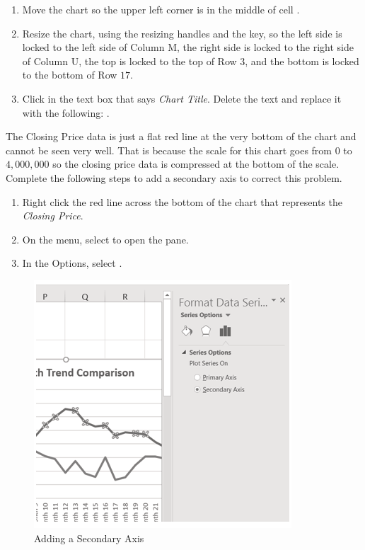 \begin{enumerate}
	\item Move the chart so the upper left corner is in the middle of cell .
	\item Resize the chart, using the resizing handles and the  key, so the left side is locked to the left side of Column M, the right side is locked to the right side of Column U, the top is locked to the top of Row $ 3 $, and the bottom is locked to the bottom of Row $ 17 $.
	\item Click in the text box that says \textit{Chart Title}. Delete the text and replace it with the following: .
\end{enumerate}

The Closing Price data is just a flat red line at the very bottom of the chart and cannot be seen very well. That is because the scale for this chart goes from $ 0 $ to $ 4,000,000 $ so the closing price data is compressed at the bottom of the scale. Complete the following steps to add a secondary axis to correct this problem.

\begin{enumerate}
	\item Right click the red line across the bottom of the chart that represents the \textit{Closing Price}.
	\item On the menu, select  to open the  pane.
	\item In the  Options, select .
\end{enumerate}

\begin{figure}[H]
	\centering
	\includegraphics[width=\maxwidth{.95\linewidth}]{gfx/ch04_fig08}
	\caption{Adding a Secondary Axis}
	\label{04:fig08}
\end{figure}

